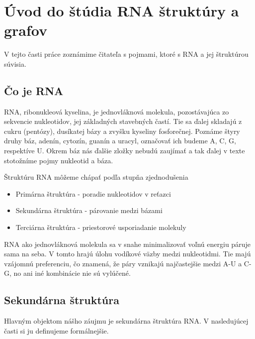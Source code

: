 \renewcommand{\SS}{\mathbb{S}}
\newcommand{\Par}[2]{\mbox{$( #1, #2 )$}}
\usetikzlibrary{positioning, shapes, trees, graphs} %
\newcommand{\scale}{0.6}

\newcommand{\tree}[1]{\ensuremath{#1}}

\chapter{Úvod do štúdia RNA štruktúry a grafov}

V tejto časti práce zoznámime čitateľa s pojmami, ktoré s RNA a jej
štruktúrou súvisia.

\section{Čo je RNA}

RNA, ribonukleová kyselina, je jednovláknová molekula, pozostávajúca
zo sekvencie nukleotidov, jej základných stavebných častí.
Tie sa ďalej skladajú z cukru (pentózy), dusíkatej bázy a zvyšku
kyseliny fosforečnej. Poznáme štyry druhy báz,
adenín, cytozín, guanín a uracyl, označovať ich budeme A, C, G, respektíve U.
Okrem báz nás ďalšie zložky nebudú zaujímať a tak ďalej v texte stotožníme
pojmy nukleotid a báza.

Štruktúru RNA môžeme chápať podľa stupňa zjednodušenia
\begin{itemize}
  \item Primárna štruktúra - poradie nukleotidov v reťazci
  \item Sekundárna štruktúra - párovanie medzi bázami
  \item Terciárna štruktúra - priestorové usporiadanie molekuly
\end{itemize}

RNA ako jednovláknová molekula sa v snahe minimalizovať voľnú energiu páruje sama na seba.
V tomto hrajú úlohu vodíkové väzby medzi nukleotidmi. Tie majú vzájomnú preferenciu,
čo znamená, že páry vznikajú najčastejšie medzi A-U a C-G, no ani iné
kombinácie nie sú vylúčené. 

\section{Sekundárna štruktúra}

Hlavným objektom nášho záujmu je sekundárna štruktúra RNA. V nasledujúcej
časti si ju definujeme formálnejšie.

